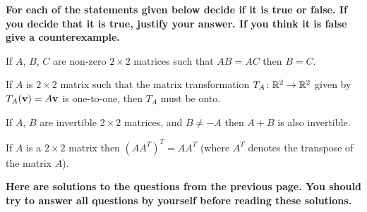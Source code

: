 \newpage

{\bf For each of the statements given below decide if it is true or false. If you decide that it is true, justify your answer. 
If you think it is false give a counterexample. }

\vskip 10mm

\benu
\item[\bf a)]  If $A$, $B$, $C$ are non-zero $2\times 2$ matrices such that $AB = AC$ then $B = C$.  
\vskip 10mm

\item[\bf b)]  If $A$ is $2\times 2$ matrix such that the matrix transformation $T_A\colon {\mathbb R}^2 \to {\mathbb R}^2$
given by $T_A({{\bf v}}) = A{\bf v}$ is one-to-one, then $T_A$ must be onto. 
\vskip 10mm

\item[\bf c)]  If $A$, $B$ are invertible $2\times 2$ matrices, and $B\neq -A$ then $A + B$ is also invertible. 

\vskip 10mm

\item[\bf d)]  If $A$ is a $2\times 2$ matrix then $ (AA^T)^T  = AA^T$ (where $A^T$ denotes the transpose 
of the matrix $A$). 

\eenu


\newpage

{\bf Here are solutions to the questions from the previous page. You should try to answer all 
questions by yourself before reading these solutions.}

\vskip 5mm 

